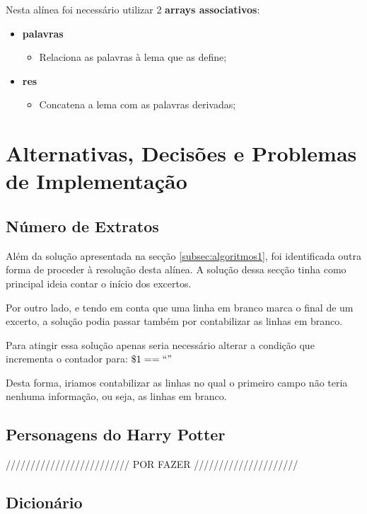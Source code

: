 \documentclass[11pt,a4paper]{report}
\begin{document}
Nesta alínea foi necessário utilizar 2 \textbf{arrays associativos}:

\begin{itemize}
	\item \textbf{palavras}
		\begin{itemize}
			\item Relaciona as palavras à lema que as define;
		\end{itemize}
	\item \textbf{res}
		\begin{itemize}
			\item Concatena a lema com as palavras derivadas;
		\end{itemize}
\end{itemize}

\section{Alternativas, Decisões e Problemas de Implementação}

\subsection{Número de Extratos}

Além da solução apresentada na secção \ref{subsec:algoritmos1}, foi identificada outra forma de proceder à resolução desta alínea. A solução dessa secção tinha como principal ideia contar o início dos excertos.

Por outro lado, e tendo em conta que uma linha em branco marca o final de um excerto, a solução podia passar também por contabilizar as linhas em branco.

Para atingir essa solução apenas seria necessário alterar a condição que incrementa o contador para: \underline{$\$1==``"$}

Desta forma, iriamos contabilizar as linhas no qual o primeiro campo não teria nenhuma informação, ou seja, as linhas em branco.

\subsection{Personagens do Harry Potter}

///////////////////////// POR FAZER /////////////////////


\subsection{Dicionário}
\end{document}

